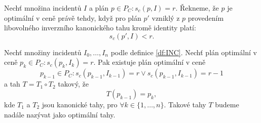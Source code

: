 \begin{definice}
  Nechť množina incidentů $I$ a plán $p \in P_C \colon s_c(p, I) = r$.
  Řekneme, že $p$ je optimální v ceně právě tehdy, když
  pro plán $p'$ vzniklý z $p$ provedením libovolného inverzního kanonického tahu kromě identity platí: 
  \begin{equation*}
    s_c(p', I) < r.
  \end{equation*}
\end{definice}

\begin{veta}\label{veta:optimalniTahy}
  Nechť množiny incidentů $I_0, \dots, I_n$ podle definice \ref{df:INC}.
  Nechť plán optimální v ceně $p_k \in P_C \colon s_c(p_k, I_k) = r$.
  Pak existuje plán optimální v ceně
  \begin{equation*}
    p_{k-1} \in P_C \colon s_c(p_{k-1}, I_{k-1}) = r \lor s_c(p_{k-1}, I_{k-1}) = r - 1
  \end{equation*}
  a tah $T = T_1 \circ T_2$ takový, že
  \begin{equation*}
    T(p_{k-1}) = p_k,
  \end{equation*}
  kde $T_1$ a $T_2$ jsou kanonické tahy, pro $\forall k \in \{ 1, \dots, n \}$.
  Takové tahy $T$ budeme nadále nazývat jako optimální tahy.
\end{veta}
